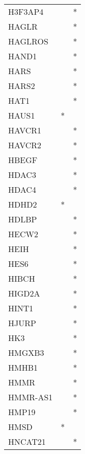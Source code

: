 \begin{longtable}{lcc}
H3F3AP4         &                &          * \\
HAGLR           &                &          * \\
HAGLROS         &                &          * \\
HAND1           &                &          * \\
HARS            &                &          * \\
HARS2           &                &          * \\
HAT1            &                &          * \\
HAUS1           &              * &            \\
HAVCR1          &                &          * \\
HAVCR2          &                &          * \\
HBEGF           &                &          * \\
HDAC3           &                &          * \\
HDAC4           &                &          * \\
HDHD2           &              * &            \\
HDLBP           &                &          * \\
HECW2           &                &          * \\
HEIH            &                &          * \\
HES6            &                &          * \\
HIBCH           &                &          * \\
HIGD2A          &                &          * \\
HINT1           &                &          * \\
HJURP           &                &          * \\
HK3             &                &          * \\
HMGXB3          &                &          * \\
HMHB1           &                &          * \\
HMMR            &                &          * \\
HMMR-AS1        &                &          * \\
HMP19           &                &          * \\
HMSD            &              * &            \\
HNCAT21         &                &          * \\

\end{longtable}
